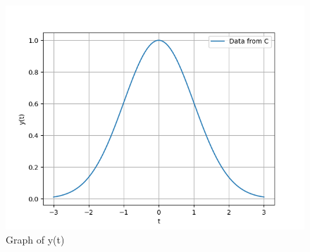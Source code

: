 \documentclass[journal,12pt,twocolumn]{IEEEtran}
\theoremstyle{remark}
\begin{document}
\begin{figure}[!h] 
    \centering
    \includegraphics[width=\columnwidth]{figs/graph_of_y(t).png}
    \caption{Graph of y(t)}
    \label{fig:Graph1_gate_CE_30}
    \end{figure}
\end{document}
